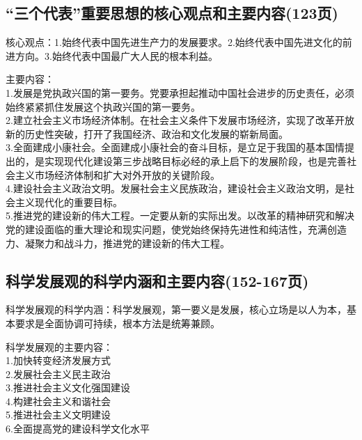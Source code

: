 \documentclass[cn,11pt]{elegantbook}
\begin{document}
\subsection{“三个代表”重要思想的核心观点和主要内容(123页)}
{\large 
{\heiti 核心观点：}1.始终代表中国先进生产力的发展要求。2.始终代表中国先进文化的前进方向。3.始终代表中国最广大人民的根本利益。

{\heiti 主要内容：}\\1.发展是党执政兴国的第一要务。党要承担起推动中国社会进步的历史责任，必须始终紧紧抓住发展这个执政兴国的第一要务。\\2.建立社会主义市场经济体制。在社会主义条件下发展市场经济，实现了改革开放新的历史性突破，打开了我国经济、政治和文化发展的崭新局面。\\3.全面建成小康社会。全面建成小康社会的奋斗目标，是立足于我国的基本国情提出的，是实现现代化建设第三步战略目标必经的承上启下的发展阶段，也是完善社会主义市场经济体制和扩大对外开放的关键阶段。\\4.建设社会主义政治文明。发展社会主义民族政治，建设社会主义政治文明，是社会主义现代化的重要目标。\\5.推进党的建设新的伟大工程。一定要从新的实际出发。以改革的精神研究和解决党的建设面临的重大理论和现实问题，使党始终保持先进性和纯洁性，充满创造力、凝聚力和战斗力，推进党的建设新的伟大工程。
}
\subsection{科学发展观的科学内涵和主要内容(152-167页)}
{\large 

{\heiti 科学发展观的科学内涵：}科学发展观，第一要义是发展，核心立场是以人为本，基本要求是全面协调可持续，根本方法是统筹兼顾。

{\heiti 科学发展观的主要内容：}\\
1.加快转变经济发展方式\\
2.发展社会主义民主政治\\
3.推进社会主义文化强国建设\\
4.构建社会主义和谐社会\\
5.推进社会主义文明建设\\
6.全面提高党的建设科学文化水平


}
\end{document}
